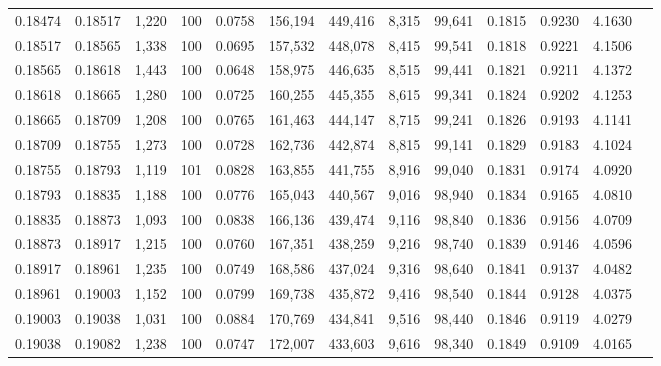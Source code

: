 \begin{tabular}{rrrrrrrrrrrrr}
0.18474 & 0.18517 & 1,220 & 100 &                                     0.0758 & 156,194 & 449,416 &   8,315 &  99,641 & 0.1815 & 0.9230 & 4.1630 \\
0.18517 & 0.18565 & 1,338 & 100 &                                     0.0695 & 157,532 & 448,078 &   8,415 &  99,541 & 0.1818 & 0.9221 & 4.1506 \\
0.18565 & 0.18618 & 1,443 & 100 &                                     0.0648 & 158,975 & 446,635 &   8,515 &  99,441 & 0.1821 & 0.9211 & 4.1372 \\
0.18618 & 0.18665 & 1,280 & 100 &                                     0.0725 & 160,255 & 445,355 &   8,615 &  99,341 & 0.1824 & 0.9202 & 4.1253 \\
0.18665 & 0.18709 & 1,208 & 100 &                                     0.0765 & 161,463 & 444,147 &   8,715 &  99,241 & 0.1826 & 0.9193 & 4.1141 \\
0.18709 & 0.18755 & 1,273 & 100 &                                     0.0728 & 162,736 & 442,874 &   8,815 &  99,141 & 0.1829 & 0.9183 & 4.1024 \\
0.18755 & 0.18793 & 1,119 & 101 &                                     0.0828 & 163,855 & 441,755 &   8,916 &  99,040 & 0.1831 & 0.9174 & 4.0920 \\
0.18793 & 0.18835 & 1,188 & 100 &                                     0.0776 & 165,043 & 440,567 &   9,016 &  98,940 & 0.1834 & 0.9165 & 4.0810 \\
0.18835 & 0.18873 & 1,093 & 100 &                                     0.0838 & 166,136 & 439,474 &   9,116 &  98,840 & 0.1836 & 0.9156 & 4.0709 \\
0.18873 & 0.18917 & 1,215 & 100 &                                     0.0760 & 167,351 & 438,259 &   9,216 &  98,740 & 0.1839 & 0.9146 & 4.0596 \\
0.18917 & 0.18961 & 1,235 & 100 &                                     0.0749 & 168,586 & 437,024 &   9,316 &  98,640 & 0.1841 & 0.9137 & 4.0482 \\
0.18961 & 0.19003 & 1,152 & 100 &                                     0.0799 & 169,738 & 435,872 &   9,416 &  98,540 & 0.1844 & 0.9128 & 4.0375 \\
0.19003 & 0.19038 & 1,031 & 100 &                                     0.0884 & 170,769 & 434,841 &   9,516 &  98,440 & 0.1846 & 0.9119 & 4.0279 \\
0.19038 & 0.19082 & 1,238 & 100 &                                     0.0747 & 172,007 & 433,603 &   9,616 &  98,340 & 0.1849 & 0.9109 & 4.0165 \\

\end{tabular}
